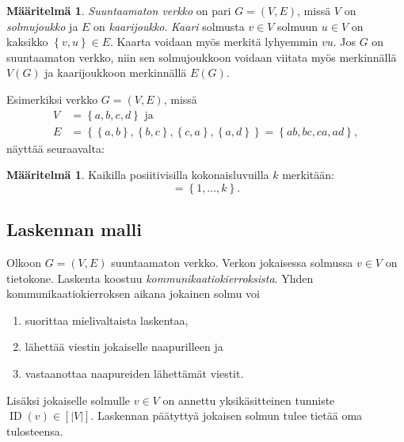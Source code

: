 \documentclass[finnish]{tktltiki2}
\theoremstyle{definition}
\newtheorem{maar}[lau]{Määritelmä}
\theoremstyle{remark}
\newcommand{\set}[1]{\left\{ #1 \right\}}
\DeclareMathOperator{\id}{ID}
\begin{document}
\begin{maar}
    \emph{Suuntaamaton verkko} on pari $G = (V,E)$, missä $V$ on
    \emph{solmujoukko} ja $E$ on \emph{kaarijoukko}. \emph{Kaari} solmusta $v
    \in V$ solmuun $u \in V$ on kaksikko $\set{v,u} \in E$. Kaarta voidaan myös
    merkitä lyhyemmin $vu$. Jos $G$ on suuntaamaton verkko, niin sen
    solmujoukkoon voidaan viitata myös merkinnällä $V(G)$ ja kaarijoukkoon
    merkinnällä $E(G)$.
\end{maar}

Esimerkiksi verkko $G = (V,E)$, missä
%
\begin{align*}
    V &= \set{a,b,c,d} \text{ ja}\\
    E &= \set{ \set{a,b}, \set{b,c}, \set{c,a}, \set{a,d}}
      = \set{ab, bc, ca, ad},
\end{align*}
%
näyttää seuraavalta:
%
\begin{center}
\end{center}

\begin{maar}
    Kaikilla posiitivisilla kokonaisluvuilla $k$ merkitään:
    \begin{equation*}
        [k] = \set{1, \dots, k}.
    \end{equation*}
\end{maar}

\subsection{Laskennan malli}

Olkoon $G = (V,E)$ suuntaamaton verkko. Verkon jokaisessa solmussa $v \in V$ on
tietokone. Laskenta koostuu \emph{kommunikaatiokierroksista}. Yhden
kommunikaatiokierroksen aikana jokainen solmu voi

\begin{enumerate}
    \item suorittaa mielivaltaista laskentaa,
    \item lähettää viestin jokaiselle naapurilleen ja
    \item vastaanottaa naapureiden lähettämät viestit.
\end{enumerate}

Lisäksi jokaiselle solmulle $v \in V$ on annettu yksikäsitteinen tunniste
$\id(v) \in [|V|]$. Laskennan päätyttyä jokaisen solmun tulee
tietää oma tulosteensa.
\end{document}
